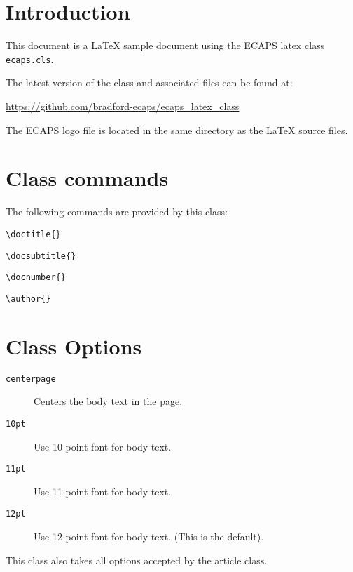 \documentclass[centerpage]{ecaps}
\author{Pete Friedhoff}
\begin{document}
\titlepage

\begin{approvals}
\end{approvals}

\begin{applicableprograms}
\end{applicableprograms}

\begin{revhistory}
\end{revhistory}

\contents

\section{Introduction}

This document is a {\LaTeX} sample document using the ECAPS latex class \texttt{ecaps.cls}.

The latest version of the class and associated files can be found at:

\begin{center}
\url{https://github.com/bradford-ecaps/ecaps_latex_class}
\end{center}

\par
The ECAPS logo file is located in the same directory as the {\LaTeX} source files.

\section{Class commands}

The following commands are provided by this class:


\texttt{\textbackslash doctitle\{<title of the document>\}}

\texttt{\textbackslash docsubtitle\{<subtitle of the document>\}}

\texttt{\textbackslash docnumber\{<document number>\}}

\texttt{\textbackslash author\{<docment author>\}}

\section{Class Options}
\begin{description}
\item [\texttt{centerpage}] Centers the body text in the page.
\item [\texttt{10pt}] Use 10-point font for body text.
\item [\texttt{11pt}] Use 11-point font for body text.
\item [\texttt{12pt}] Use 12-point font for body text. (This is the default).
\end{description}
This class also takes all options accepted by the article class.
\end{document}
